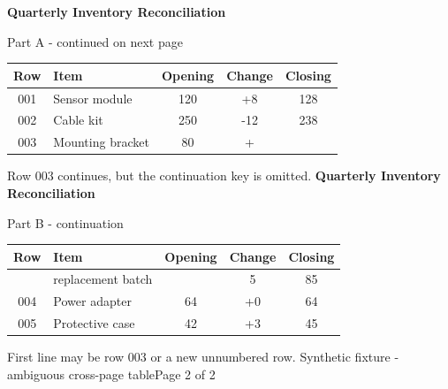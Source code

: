 \documentclass[11pt,a4paper]{article}
\begin{document}
{\fontsize{19}{23}\selectfont\bfseries Quarterly Inventory Reconciliation}\par\vspace{2mm}
{\color{gray}\small Part A - continued on next page}\par\vspace{7mm}
\renewcommand{\arraystretch}{1.8}
\begin{tabular}{|c|m{60mm}|c|c|c|}\hline
\rowcolor{gray!15} Row & Item & Opening & Change & Closing\\\hline
001 & Sensor module & 120 & +8 & 128\\\hline
002 & Cable kit & 250 & -12 & 238\\\hline
003 & Mounting bracket & 80 & + & \\\hline
\end{tabular}
\vspace{8mm}\par\color{orange!70!black}\small Row 003 continues, but the continuation key is omitted.
\newpage
{\fontsize{19}{23}\selectfont\bfseries Quarterly Inventory Reconciliation}\par\vspace{2mm}
{\color{gray}\small Part B - continuation}\par\vspace{7mm}
\renewcommand{\arraystretch}{1.8}
\begin{tabular}{|c|m{60mm}|c|c|c|}\hline
\rowcolor{gray!15} Row & Item & Opening & Change & Closing\\\hline
 & replacement batch &  & 5 & 85\\\hline
004 & Power adapter & 64 & +0 & 64\\\hline
005 & Protective case & 42 & +3 & 45\\\hline
\end{tabular}
\vspace{8mm}\par\color{orange!70!black}\small First line may be row 003 or a new unnumbered row.
\vfill\scriptsize Synthetic fixture - ambiguous cross-page table\hfill Page 2 of 2
\end{document}
